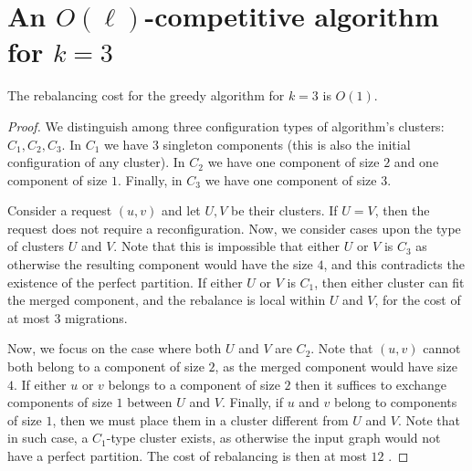 \section{An $O(\ell)$-competitive algorithm for $k=3$}

\begin{theorem}
  The rebalancing cost for the greedy algorithm for $k=3$ is $O(1)$.
  \label{rebalancing-cost}
\end{theorem}

\begin{proof} 
  
  We distinguish among three configuration types of algorithm's clusters: $C_1, C_2, C_3$. In $C_1$ we have $3$ singleton components (this is also the initial configuration of any cluster). In $C_2$ we have one component of size $2$ and one component of size $1$. Finally, in $C_3$ we have one component of size $3$.

  Consider a request $(u, v)$ and let $U, V$ be their clusters.
  If $U=V$, then the request does not require a reconfiguration.
  Now, we consider cases upon the type of clusters $U$ and $V$.
  Note that this is impossible that either $U$ or $V$ is $C_3$ as otherwise the resulting component would have the size $4$, and this contradicts the existence of the perfect partition.
  If either $U$ or $V$ is $C_1$, then either cluster can fit the merged component, and the rebalance is local within $U$ and $V$, for the cost of at most $3$ migrations.

  Now, we focus on the case where both $U$ and $V$ are $C_2$. Note that $(u,v)$ cannot both belong to a component of size $2$, as the merged component would have size $4$.
  If either $u$ or $v$ belongs to a component of size $2$ then it suffices to exchange components of size $1$ between $U$ and $V$.
  Finally, if $u$ and $v$ belong to components of size $1$, then we must place them in a cluster different from $U$ and $V$.
  Note that in such case, a $C_1$-type cluster exists, as otherwise the input graph would not have a perfect partition. The cost of rebalancing is then at most $12$ .
\end{proof}

